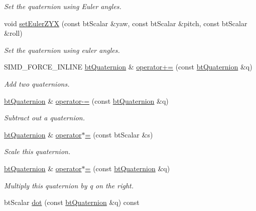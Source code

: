 \begin{DoxyCompactItemize}
\begin{DoxyCompactList}\small\item\em Set the quaternion using Euler angles. \end{DoxyCompactList}\item 
void \hyperlink{classbtQuaternion_a808b430136b4a8d1e7120134af14a1ff}{set\+Euler\+Z\+YX} (const bt\+Scalar \&yaw, const bt\+Scalar \&pitch, const bt\+Scalar \&roll)
\begin{DoxyCompactList}\small\item\em Set the quaternion using euler angles. \end{DoxyCompactList}\item 
S\+I\+M\+D\+\_\+\+F\+O\+R\+C\+E\+\_\+\+I\+N\+L\+I\+NE \hyperlink{classbtQuaternion}{bt\+Quaternion} \& \hyperlink{classbtQuaternion_a1212e4cbaa71da187984d3c174a4cc04}{operator+=} (const \hyperlink{classbtQuaternion}{bt\+Quaternion} \&q)
\begin{DoxyCompactList}\small\item\em Add two quaternions. \end{DoxyCompactList}\item 
\hyperlink{classbtQuaternion}{bt\+Quaternion} \& \hyperlink{classbtQuaternion_ac942e70c62d09538e3f6d9c42bc42c5c}{operator-\/=} (const \hyperlink{classbtQuaternion}{bt\+Quaternion} \&q)
\begin{DoxyCompactList}\small\item\em Subtract out a quaternion. \end{DoxyCompactList}\item 
\hyperlink{classbtQuaternion}{bt\+Quaternion} \& \hyperlink{classbtQuaternion_abd260487e98defbd77618f04d51fcc92}{operator$\ast$=} (const bt\+Scalar \&s)
\begin{DoxyCompactList}\small\item\em Scale this quaternion. \end{DoxyCompactList}\item 
\hyperlink{classbtQuaternion}{bt\+Quaternion} \& \hyperlink{classbtQuaternion_abfc6dee30a6f56e69343a31368713f95}{operator$\ast$=} (const \hyperlink{classbtQuaternion}{bt\+Quaternion} \&q)
\begin{DoxyCompactList}\small\item\em Multiply this quaternion by q on the right. \end{DoxyCompactList}\item 
bt\+Scalar \hyperlink{classbtQuaternion_a406d3d2debf9d463f2ba651b0a196d47}{dot} (const \hyperlink{classbtQuaternion}{bt\+Quaternion} \&q) const

\end{DoxyCompactItemize}
